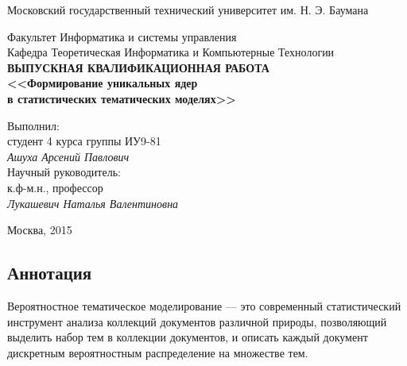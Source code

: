\documentclass[a4paper, 14pt]{extarticle}
\begin{document}
\begin{small}
	\begin{titlepage}
		\begin{center}
			Московский государственный технический университет им. Н. Э. Баумана 
			
			\bigskip
			
			\bigskip
			Факультет Информатика и системы управления\\
			Кафедра Теоретическая Информатика и Компьютерные Технологии \\[10mm]
			
			\textbf{\textsf{\large
				ВЫПУСКНАЯ КВАЛИФИКАЦИОННАЯ РАБОТА\\[10mm]
				<<Формирование уникальных ядер \\в статистических тематических моделях>>
			}}\\[10mm]
			
			\begin{flushright}
				\parbox{0.5\textwidth}{
					Выполнил:\\
					студент 4 курса группы ИУ9-81\\
					\emph{Ашуха Арсений Павлович}\\[5mm]
					Научный руководитель:\\
					к.ф-м.н., профессор\\
					\emph{Лукашевич Наталья Валентиновна}
				}
			\end{flushright}
			
			\vspace{\fill}
			Москва, 2015
		\end{center}
	\end{titlepage}

\end{small}	

	\newpage
	\renewcommand{\contentsname}{Содержание}

	\tableofcontents	
	\newpage


\begin{center} \section*{Аннотация} \end{center}
Вероятностное тематическое моделирование --- это современный  статистический инструмент анализа коллекций документов различной природы, позволяющий выделить набор тем в коллекции документов, и описать каждый документ дискретным вероятностным распределение на множестве тем.
\end{document}
